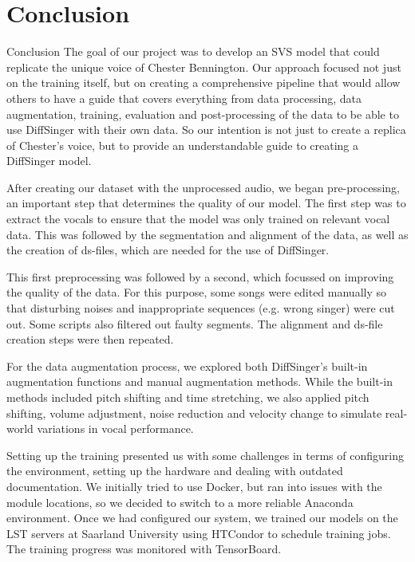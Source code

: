 \documentclass[a4paper]{article}
\begin{document}
	
	
	
	\section{Conclusion}
	
	Conclusion
	The goal of our project was to develop an SVS model that could replicate the unique voice of Chester Bennington. Our approach focused not just on the training itself, but on creating a comprehensive pipeline that would allow others to have a guide that covers everything from data processing, data augmentation, training, evaluation and post-processing of the data to be able to use DiffSinger with their own data. So our intention is not just to create a replica of Chester's voice, but to provide an understandable guide to creating a DiffSinger model.
	
	After creating our dataset with the unprocessed audio, we began pre-processing, an important step that determines the quality of our model. The first step was to extract the vocals to ensure that the model was only trained on relevant vocal data. This was followed by the segmentation and alignment of the data, as well as the creation of ds-files, which are needed for the use of DiffSinger.
	
	This first preprocessing was followed by a second, which focussed on improving the quality of the data. For this purpose, some songs were edited manually so that disturbing noises and inappropriate sequences (e.g. wrong singer) were cut out. Some scripts also filtered out faulty segments. The alignment and ds-file creation steps were then repeated.
	
	For the data augmentation process, we explored both DiffSinger's built-in augmentation functions and manual augmentation methods. While the built-in methods included pitch shifting and time stretching, we also applied pitch shifting, volume adjustment, noise reduction and velocity change to simulate real-world variations in vocal performance.
	
	
	Setting up the training presented us with some challenges in terms of configuring the environment, setting up the hardware and dealing with outdated documentation. We initially tried to use Docker, but ran into issues with the module locations, so we decided to switch to a more reliable Anaconda environment. Once we had configured our system, we trained our models on the LST servers at Saarland University using HTCondor to schedule training jobs. The training progress was monitored with TensorBoard.
	
\end{document}
